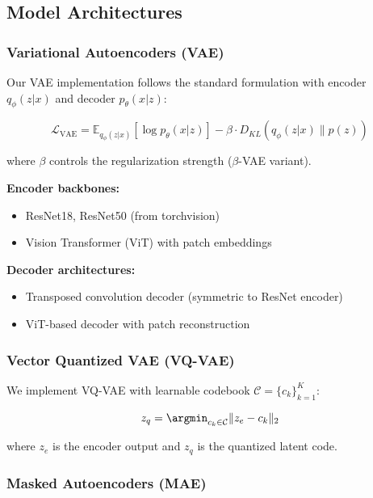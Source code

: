 \subsection{Model Architectures}

\subsubsection{Variational Autoencoders (VAE)}

Our VAE implementation follows the standard formulation with encoder $q_\phi(z|x)$ and decoder $p_\theta(x|z)$:

\begin{equation}
\mathcal{L}_{\text{VAE}} = \mathbb{E}_{q_\phi(z|x)}[\log p_\theta(x|z)] - \beta \cdot D_{KL}(q_\phi(z|x) \| p(z))
\end{equation}

where $\beta$ controls the regularization strength ($\beta$-VAE variant).

\textbf{Encoder backbones:}
\begin{itemize}
    \item ResNet18, ResNet50 (from torchvision)
    \item Vision Transformer (ViT) with patch embeddings
\end{itemize}

\textbf{Decoder architectures:}
\begin{itemize}
    \item Transposed convolution decoder (symmetric to ResNet encoder)
    \item ViT-based decoder with patch reconstruction
\end{itemize}

\subsubsection{Vector Quantized VAE (VQ-VAE)}

We implement VQ-VAE with learnable codebook $\mathcal{C} = \{c_k\}_{k=1}^K$:

\begin{equation}
z_q = \argmin_{c_k \in \mathcal{C}} \|z_e - c_k\|_2
\end{equation}

where $z_e$ is the encoder output and $z_q$ is the quantized latent code.

\subsubsection{Masked Autoencoders (MAE)}

